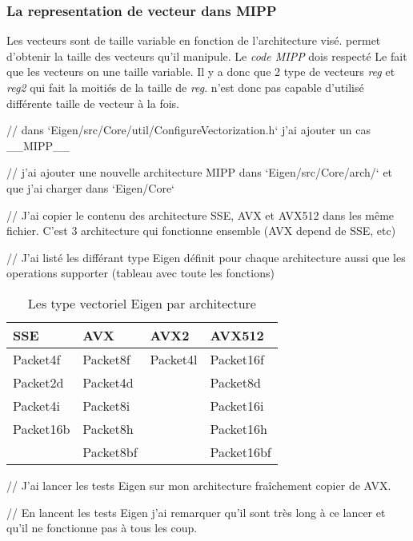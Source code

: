 \subsubsection{La representation de vecteur dans MIPP}
{
  Les vecteurs sont de taille variable en fonction de l'architecture visé. \MIPP permet
  d'obtenir la taille des vecteurs qu'il manipule. Le \emph{code MIPP} dois respecté
  Le fait que les vecteurs on une taille variable. Il y a donc que 2 type de vecteurs
  \emph{reg} et \emph{reg2} qui fait la moitiés de la taille de \emph{reg}.
  \MIPP n'est donc pas capable d'utilisé différente taille de vecteur à la fois.
}

// dans `Eigen/src/Core/util/ConfigureVectorization.h` j'ai ajouter un cas __MIPP__

// j'ai ajouter une nouvelle architecture MIPP dans `Eigen/src/Core/arch/` et que j'ai
charger dans `Eigen/Core`

// J'ai copier le contenu des architecture SSE, AVX et AVX512 dans les même fichier.
C'est 3 architecture qui fonctionne ensemble (AVX depend de SSE, etc)

// J'ai listé les différant type Eigen définit pour chaque architecture aussi que les
operations supporter (tableau avec toute les fonctions)

\begin{table}[H]
  \centering
  \begin{tabular}[H]{|l|l|l|l|}
    \hline
    \textbf{SSE} & \textbf{AVX} & \textbf{AVX2} & \textbf{AVX512} \\
    \hline
    Packet4f     & Packet8f     & Packet4l      & Packet16f       \\
    \hline
    Packet2d     & Packet4d     &               & Packet8d        \\
    \hline
    Packet4i     & Packet8i     &               & Packet16i       \\
    \hline
    Packet16b    & Packet8h     &               & Packet16h       \\
    \hline
                 & Packet8bf    &               & Packet16bf      \\
    \hline
  \end{tabular}
  \caption{Les type vectoriel Eigen par architecture}
\end{table}

// J'ai lancer les tests Eigen sur mon architecture fraîchement copier de AVX.

// En lancent les tests Eigen j'ai remarquer qu'il sont très long à ce lancer et qu'il
ne fonctionne pas à tous les coup.

